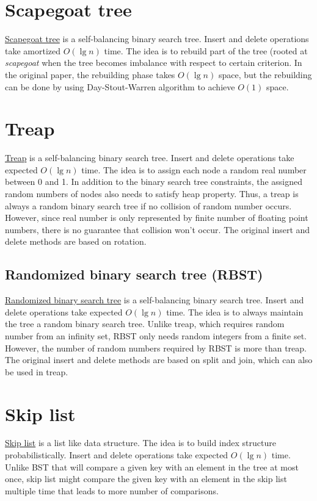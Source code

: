 \section{Scapegoat tree}
\href{https://en.wikipedia.org/wiki/Scapegoat_tree}{Scapegoat tree} is a self-balancing binary search tree. Insert and delete operations take amortized $O(\lg n)$ time. The idea is to rebuild part of the tree (rooted at \emph{scapegoat} when the tree becomes imbalance with respect to certain criterion. In the original paper, the rebuilding phase takes $O(\lg n)$ space, but the rebuilding can be done by using Day-Stout-Warren algorithm to achieve $O(1)$ space.

\section{Treap}
\href{https://en.wikipedia.org/wiki/Treap}{Treap} is a self-balancing binary search tree. Insert and delete operations take expected $O(\lg n)$ time. The idea is to assign each node a random real number between 0 and 1. In addition to the binary search tree constraints, the assigned random numbers of nodes also needs to satisfy heap property. Thus, a treap is always a random binary search tree if no collision of random number occurs. However, since real number is only represented by finite number of floating point numbers, there is no guarantee that collision won't occur. The original insert and delete methods are based on rotation.

\subsection{Randomized binary search tree (RBST)}
\href{https://en.wikipedia.org/wiki/Treap#Randomized_binary_search_tree}{Randomized binary search tree}  is a self-balancing binary search tree. Insert and delete operations take expected $O(\lg n)$ time. The idea is to always maintain the tree a random binary search tree. Unlike treap, which requires random number from an infinity set, RBST only needs random integers from a finite set. However, the number of random numbers required by RBST is more than treap.
The original insert and delete methods are based on split and join, which can also be used in treap.

\section{Skip list}
\href{https://en.wikipedia.org/wiki/Skip_list}{Skip list} is a list like data structure. The idea is to build index structure probabilistically. Insert and delete operations take expected $O(\lg n)$ time. Unlike BST that will compare a given key with an element in the tree at most once, skip list might compare  the given key with an element in the skip list multiple time that leads to more number of comparisons.

